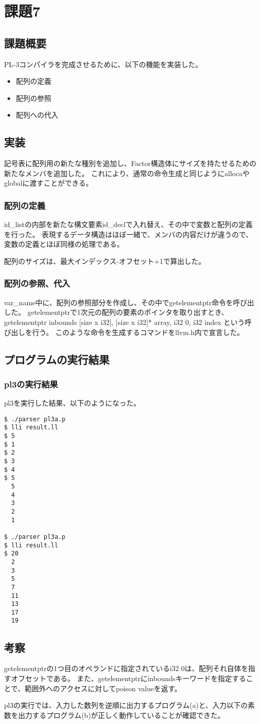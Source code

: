 \section{課題7}
\subsection{課題概要}
PL-3コンパイラを完成させるために、以下の機能を実装した。
\begin{itemize}
  \item 配列の定義
  \item 配列の参照
  \item 配列への代入
\end{itemize}

\subsection{実装}
記号表に配列用の新たな種別を追加し、Factor構造体にサイズを持たせるための新たなメンバを追加した。
これにより、通常の命令生成と同じようにallocaやglobalに渡すことができる。

\subsubsection{配列の定義}
id\_listの内部を新たな構文要素id\_declで入れ替え、その中で変数と配列の定義を行った。
表現するデータ構造はほぼ一緒で、メンバの内容だけが違うので、変数の定義とほぼ同様の処理である。

配列のサイズは、最大インデックス-オフセット+1で算出した。

\subsubsection{配列の参照、代入}
var\_name中に、配列の参照部分を作成し、その中でgetelementptr命令を呼び出した。
getelementptrで1次元の配列の要素のポインタを取り出すとき、getelementptr inbounds [size x i32], [size x i32]* array, i32 0, i32 index という呼び出しを行う。
このような命令を生成するコマンドをllvm.h内で宣言した。

\subsection{プログラムの実行結果}
\subsubsection{pl3の実行結果}
pl3を実行した結果、以下のようになった。
\begin{lstlisting}[caption={pl3.pの実行結果},label={pl3.pの実行結果}]
$ ./parser pl3a.p
$ lli result.ll
$ 5
$ 1
$ 2
$ 3
$ 4
$ 5
  5
  4
  3
  2
  1

$ ./parser pl3a.p
$ lli result.ll
$ 20
  2
  3
  5
  7
  11
  13
  17
  19
\end{lstlisting}

\subsection{考察}
getelementptrの1つ目のオペランドに指定されているi32 0は、配列それ自体を指すオフセットである。
また、getelementptrにinboundsキーワードを指定することで、範囲外へのアクセスに対してpoison valueを返す。

pl3の実行では、入力した数列を逆順に出力するプログラム(a)と、入力以下の素数を出力するプログラム(b)が正しく動作していることが確認できた。
